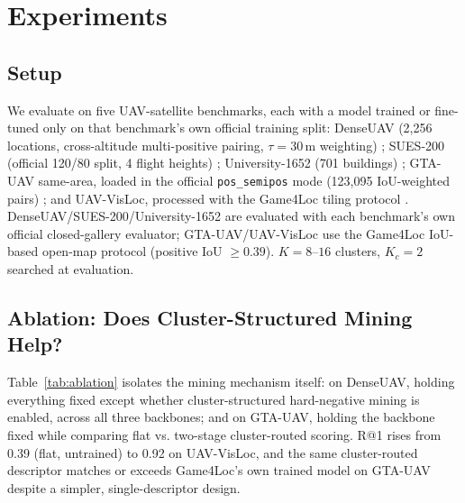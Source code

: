 \documentclass[conference]{IEEEtran}
\begin{document}
\section{Experiments}
\subsection{Setup}
We evaluate on five UAV-satellite benchmarks, each with a model trained
or fine-tuned only on that benchmark's own official training split:
DenseUAV (2,256 locations, cross-altitude multi-positive pairing,
$\tau{=}30$\,m weighting) \cite{dai2024denseuav}; SUES-200 (official
120/80 split, 4 flight heights) \cite{zhu2023sues}; University-1652 (701
buildings) \cite{zheng2020university1652}; GTA-UAV same-area, loaded in
the official \texttt{pos\_semipos} mode (123,095 IoU-weighted pairs)
\cite{ji2024game4loc}; and UAV-VisLoc, processed with the Game4Loc tiling
protocol \cite{xu2024uavvisloc}. DenseUAV/SUES-200/University-1652 are
evaluated with each benchmark's own official closed-gallery evaluator;
GTA-UAV/UAV-VisLoc use the Game4Loc IoU-based open-map protocol
(positive IoU $\geq 0.39$). $K{=}8$--$16$ clusters, $K_c{=}2$ searched at
evaluation.

\subsection{Ablation: Does Cluster-Structured Mining Help?}
Table~\ref{tab:ablation} isolates the mining mechanism itself: on DenseUAV,
holding everything fixed except whether cluster-structured hard-negative
mining is enabled, across all three backbones; and on GTA-UAV, holding the
backbone fixed while comparing flat vs. two-stage cluster-routed scoring.
R@1 rises from 0.39 (flat, untrained) to 0.92 on UAV-VisLoc, and the same
cluster-routed descriptor matches or exceeds Game4Loc's own trained
model on GTA-UAV despite a simpler, single-descriptor design.
\end{document}
